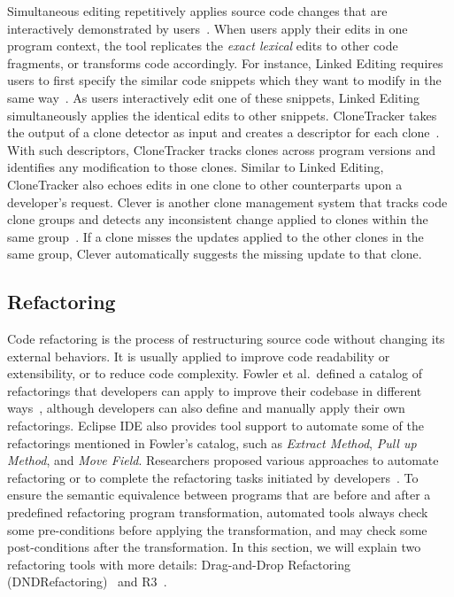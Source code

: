 Simultaneous editing repetitively applies source code changes that are interactively demonstrated by users~\cite{MiM2001}. When users apply their edits in one program context, the tool replicates the \emph{exact lexical} edits to other code fragments, or transforms code accordingly. For instance, Linked Editing requires users to first specify the similar code snippets which they want to modify in the same way~\cite{TBG2004}. As users interactively edit one of these snippets, Linked Editing simultaneously applies the identical edits to other snippets. 
CloneTracker takes the output of a clone detector as input and creates a descriptor for each clone~\cite{DuR2007}. With such descriptors, CloneTracker tracks clones across program versions and identifies any modification to those clones. 
Similar to Linked Editing, CloneTracker also echoes edits in one clone to other counterparts upon a developer's request. 
Clever is another clone management system that tracks code clone groups and detects any inconsistent change applied to clones within the same group~\cite{NNP2009}. If a clone misses the updates applied to the other clones in the same group, Clever automatically suggests the missing update to that clone.

\subsection{Refactoring}
\label{sec:refactoring}
Code refactoring is the process of restructuring source code without changing its external behaviors. It is usually applied to improve code readability or extensibility, or to reduce code complexity. 
Fowler et al.~defined a catalog of refactorings that developers can apply to improve their codebase in different ways~\cite{1999:RID}, although developers can also define and manually apply their own refactorings. Eclipse IDE also provides tool support to automate some of the refactorings mentioned in Fowler's catalog, such as \emph{Extract Method}, \emph{Pull up Method}, and \emph{Move Field}. Researchers proposed various approaches to automate refactoring or to complete the refactoring tasks initiated by developers~\cite{Griswold:1992,Balazinska1999,Dig:2009,Ge:2012,Chen:2013,Lee:2013,Tsantalis2013:icsm,Meng:2015,Kim:2016}. To ensure the semantic equivalence between programs that are before and after a predefined refactoring program transformation, automated tools always check some pre-conditions before applying the transformation, and may check some post-conditions after the transformation.
In this section, we will explain two refactoring tools with more details: Drag-and-Drop Refactoring (DNDRefactoring)~\cite{Lee:2013} and R3~\cite{Kim:2016}.


